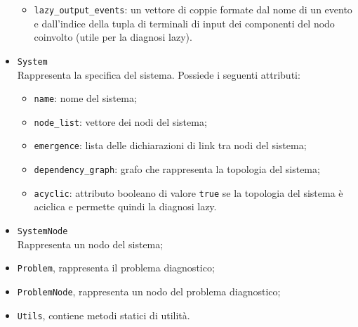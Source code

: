 \begin{itemize}
\begin{itemize}
\item \verb|lazy_output_events|: un vettore di coppie formate dal nome di un evento e dall'indice della tupla di terminali di input dei componenti del nodo coinvolto (utile per la diagnosi lazy).
\end{itemize}
\item \verb|System|\\
Rappresenta la specifica del sistema. Possiede i seguenti attributi:
\begin{itemize}
\item \verb|name|: nome del sistema;
\item \verb|node_list|: vettore dei nodi del sistema;
\item \verb|emergence|: lista delle dichiarazioni di link tra nodi del sistema;
\item \verb|dependency_graph|: grafo che rappresenta la topologia del sistema;
\item \verb|acyclic|: attributo booleano di valore \verb|true| se la topologia del sistema è aciclica e permette quindi la diagnosi lazy.
\end{itemize}
\item \verb|SystemNode|\\
Rappresenta un nodo del sistema;
\item \verb|Problem|, rappresenta il problema diagnostico;
\item \verb|ProblemNode|, rappresenta un nodo del problema diagnostico;
\item \verb|Utils|, contiene metodi statici di utilità.
\end{itemize}


